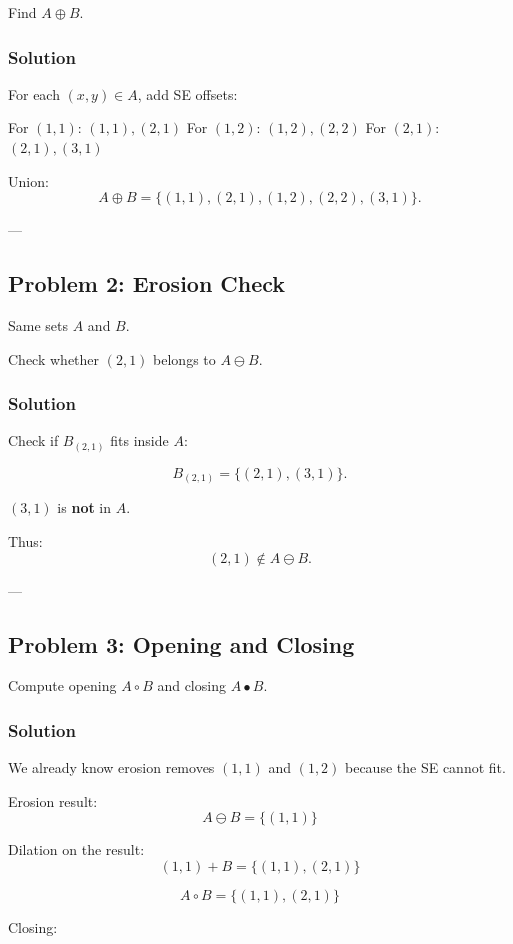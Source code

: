 \documentclass{AnantDocumentation}
\begin{document}
Find $A \oplus B$.

\subsubsection*{Solution}

For each $(x,y) \in A$, add SE offsets:

For $(1,1)$: $(1,1),(2,1)$  
For $(1,2)$: $(1,2),(2,2)$  
For $(2,1)$: $(2,1),(3,1)$

Union:
\[
A \oplus B = \{(1,1),(2,1),(1,2),(2,2),(3,1)\}.
\]

---

\subsection*{Problem 2: Erosion Check}

Same sets $A$ and $B$.

Check whether $(2,1)$ belongs to $A \ominus B$.

\subsubsection*{Solution}

Check if $B_{(2,1)}$ fits inside $A$:

\[
B_{(2,1)} = \{(2,1),(3,1)\}.
\]

$(3,1)$ is \textbf{not} in $A$.

Thus:
\[
(2,1) \notin A \ominus B.
\]

---

\subsection*{Problem 3: Opening and Closing}

Compute opening $A \circ B$ and closing $A \bullet B$.

\subsubsection*{Solution}

We already know erosion removes $(1,1)$ and $(1,2)$ because the SE cannot fit.

Erosion result:
\[
A \ominus B = \{(1,1)\}
\]

Dilation on the result:
\[
(1,1) + B = \{(1,1),(2,1)\}
\]

\[
\boxed{A \circ B = \{(1,1),(2,1)\}}
\]

Closing:
\end{document}
